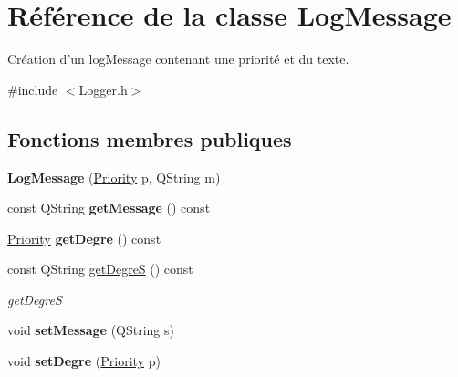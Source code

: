 \hypertarget{class_log_message}{\section{Référence de la classe Log\-Message}
\label{class_log_message}
}


Création d'un log\-Message contenant une priorité et du texte.  




{\ttfamily \#include $<$Logger.\-h$>$}

\subsection*{Fonctions membres publiques}
\begin{DoxyCompactItemize}
\item 
\hypertarget{class_log_message_a877e3559f31a6d3d2bde5af81c463793}{{\bfseries Log\-Message} (\hyperlink{_logger_8h_a315655b1bb5848c063491adffde62b15}{Priority} p, Q\-String m)}\label{class_log_message_a877e3559f31a6d3d2bde5af81c463793}

\item 
\hypertarget{class_log_message_a5eadf0005e94f51be412ef72d352ed6d}{const Q\-String {\bfseries get\-Message} () const }\label{class_log_message_a5eadf0005e94f51be412ef72d352ed6d}

\item 
\hypertarget{class_log_message_a1ad8edf16b9f7d748c2960361d0d7b94}{\hyperlink{_logger_8h_a315655b1bb5848c063491adffde62b15}{Priority} {\bfseries get\-Degre} () const }\label{class_log_message_a1ad8edf16b9f7d748c2960361d0d7b94}

\item 
const Q\-String \hyperlink{class_log_message_a5871b44905b230254daacd1432dddc68}{get\-Degre\-S} () const 
\begin{DoxyCompactList}\small\item\em get\-Degre\-S \end{DoxyCompactList}\item 
\hypertarget{class_log_message_aab0be2a0e35b66bb0d5f8e1dc9701c5d}{void {\bfseries set\-Message} (Q\-String s)}\label{class_log_message_aab0be2a0e35b66bb0d5f8e1dc9701c5d}

\item 
\hypertarget{class_log_message_ab9cfd9695f1e0d486dd2bdeb03f29e8d}{void {\bfseries set\-Degre} (\hyperlink{_logger_8h_a315655b1bb5848c063491adffde62b15}{Priority} p)}\label{class_log_message_ab9cfd9695f1e0d486dd2bdeb03f29e8d}

\end{DoxyCompactItemize}


